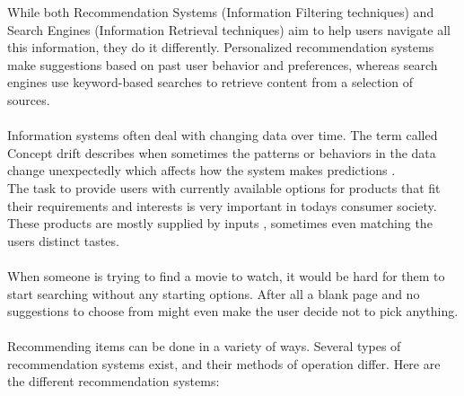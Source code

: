 \documentclass[\myFontSize,oneside,english,hidelinks,a4paper]{article}
\begin{document}
%
While both Recommendation Systems (Information Filtering techniques) and Search Engines (Information Retrieval techniques) aim to help users navigate all this information, they do it differently. Personalized recommendation systems make suggestions based on past user behavior and preferences, whereas search engines use keyword-based searches to retrieve content from a selection of sources.\\\\
%
Information systems often deal with changing data over time. The term called Concept drift describes when sometimes the patterns or behaviors in the data change unexpectedly which affects how the system makes predictions \cite{Sun2024}.\\
The task to provide users with currently available options for products that fit their requirements and interests is very important in todays consumer society. These products are mostly supplied by inputs \cite{Philip2014} , sometimes even matching the users distinct tastes.\\\\
%
When someone is trying to find a movie to watch, it would be hard for them to start searching without any starting options. After all a blank page and no suggestions to choose from might even make the user decide not to pick anything. \\\\
%
\newpage{}
Recommending items can be done in a variety of ways. Several types of recommendation systems exist, and their methods of operation differ. Here are the different recommendation systems:\\

%
\end{document}
